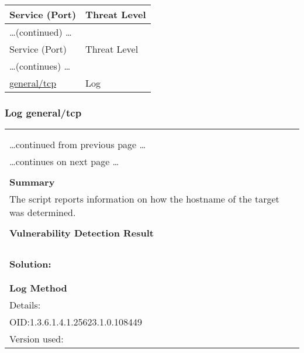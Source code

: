 \documentclass{article}
\begin{document}
\begin{longtable}{|l|l|}
\hline
\rowcolor{gvm_report}Service (Port)&Threat Level\\
\hline
\endfirsthead
\multicolumn{2}{l}{\hfill\ldots (continued) \ldots}\\
\hline
\rowcolor{gvm_report}Service (Port)&Threat Level\\
\hline
\endhead
\hline
\multicolumn{2}{l}{\ldots (continues) \ldots}\\
\endfoot
\hline
\endlastfoot
\hline
\hyperref[port:192.168.178.24 general/tcp Log]{general/tcp}&Log\\
\hline
\end{longtable}



\subsubsection{Log general/tcp}
\label{port:192.168.178.24 general/tcp Log}

\begin{longtable}{|p{}|}
\hline
\rowcolor{gvm_log}{\color{white}{Log (CVSS: 0.0) }}\\
\rowcolor{gvm_log}{\color{white}{NVT: Hostname Determination Reporting}}\\
\hline
\endfirsthead
\hfill\ldots continued from previous page \ldots \\
\hline
\endhead
\hline
\ldots continues on next page \ldots \\
\endfoot
\hline
\endlastfoot
\\
\textbf{Summary}\\
The script reports information on how the hostname
  of the target was determined.\\

        \hline
        \\
\textbf{Vulnerability Detection Result}\\
\rowcolor{white}{\verb=Hostname determination for IP 192.168.178.24:=}\\
\rowcolor{white}{\verb=Hostname|Source=}\\
\rowcolor{white}{\verb=192.168.178.24|IP-address=}\\

          \hline
          \\
\textbf{Solution:}\\
\\


        \hline
        \\
\textbf{Log Method}\\
Details:
\rowcolor{white}{\verb=Hostname Determination Reporting=}\\
OID:1.3.6.1.4.1.25623.1.0.108449\\
Version used:
\rowcolor{white}{\verb=2018-11-19T11:11:31Z=}\\
\end{longtable}
\end{document}
